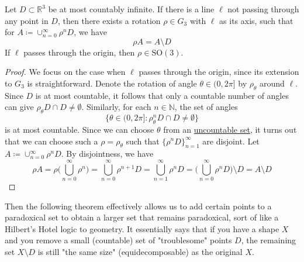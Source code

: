   \begin{lemma}
    \label{thm:irrational-rotation-relative-to-points}
    Let $D \subset \mathbb{R}^3$ be at most countably infinite. If there is a line $\ell$ not passing through any point in $D$, then there exists a rotation $\rho \in G_3$ with $\ell$ as its axis, such that for $A \coloneqq \cup_{n=0}^\infty \rho^n D$, we have 
    \begin{equation}
      \rho A = A \setminus D
    \end{equation}
    If $\ell$ passes through the origin, then $\rho \in \mathrm{SO}(3)$.  
  \end{lemma}
  \begin{proof}
    We focus on the case when $\ell$ passes through the origin, since its extension to $G_3$ is straightforward. Denote the rotation of angle $\theta \in (0, 2\pi]$ by $\rho_\theta$ around $\ell$. Since $D$ is at most countable, it follows that only a countable number of angles can give $\rho_\theta D \cap D \neq \emptyset$. Similarly, for each $n \in \mathbb{N}$, the set of angles 
    \begin{equation}
      \{ \theta \in (0, 2 \pi] \colon \rho_\theta^n D \cap D \neq \emptyset \}
    \end{equation} 
    is at most countable. Since we can choose $\theta$ from an \hyperref[def:uncountable-set]{uncountable set}, it turns out that we can choose such a $\rho = \rho_\theta$ such that $\{\rho^n D\}_{n=1}^\infty$ are disjoint. Let $A \coloneqq \cup_{n=0}^\infty \rho^n D$. By disjointness, we have 
    \begin{equation}
      \rho A = \rho \bigg( \bigcup_{n=0}^\infty \rho^n \bigg) = \bigcup_{n=0}^\infty \rho^{n+1} D = \bigcup_{n=1}^\infty \rho^n D = \bigg( \bigcup_{n=0}^\infty \rho^n D \bigg) \setminus D = A \setminus D
    \end{equation}
  \end{proof}

  Then the following theorem effectively allows us to add certain points to a paradoxical set to obtain a larger set that remains paradoxical, sort of like a Hilbert's Hotel logic to geometry. It essentially says that if you have a shape $X$ and you remove a small (countable) set of "troublesome" points $D$, the remaining set $X \setminus D$ is still "the same size" (equidecomposable) as the original $X$.

